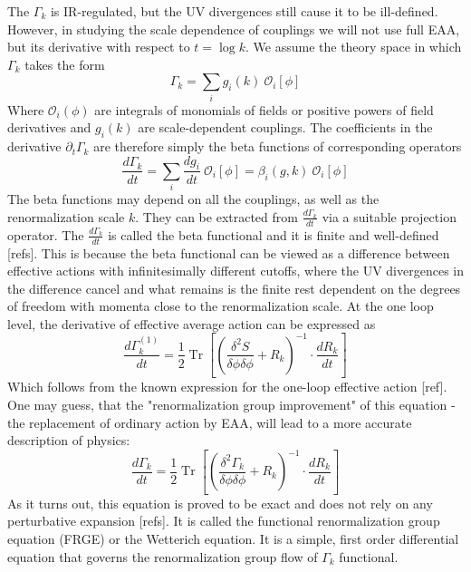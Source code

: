 \documentclass[11pt, a4paper]{article}
\begin{document}
The $\Gamma_k$ is IR-regulated, but the UV divergences still cause it to be ill-defined. 
However, in studying the scale dependence of couplings we will not use full EAA, 
but its derivative with respect to $t = \log{k}$.
We assume the theory space in which $\Gamma_k$ takes the form
\begin{equation}
    \Gamma_k = \sum_i g_i(k) \ \mathcal{O}_i [\phi]
    \label{gamma_decomp}
\end{equation}
Where $\mathcal{O}_i (\phi)$ are integrals of monomials of fields or positive powers of field derivatives 
and $g_i(k)$ are scale-dependent couplings.
The coefficients in the derivative $\partial_t \Gamma_k$ are therefore simply the beta functions of corresponding operators
\begin{equation}
    \frac{d \Gamma_k}{dt} = \sum_i \frac{d g_i}{dt} \ \mathcal{O}_i [\phi] = \beta_i(g,k) \ \mathcal{O}_i [\phi]
\end{equation}
The beta functions may depend on all the couplings, as well as the renormalization scale $k$.
They can be extracted from $\frac{d \Gamma_k}{dt}$ via a suitable projection operator. 
The $\frac{d \Gamma_k}{dt}$ is called the beta functional and it is finite and well-defined [refs].
This is because the beta functional can be viewed as a difference between effective actions with infinitesimally
different cutoffs, where the UV divergences in the difference cancel and what remains is the finite rest
dependent on the degrees of freedom with momenta close to the renormalization scale.
At the one loop level, the derivative of effective average action can be expressed as
\begin{equation}
    \frac{d \Gamma_k^{(1)}}{dt} = \frac{1}{2} \operatorname{Tr} \left[ \left(\frac{\delta^2 S}{\delta \phi \delta \phi} + R_k\right)^{-1} \cdot \frac{d R_k}{dt} \right]
\end{equation}
Which follows from the known expression for the one-loop effective action [ref].
One may guess, that the "renormalization group improvement" of this equation - the replacement of ordinary action by
 EAA, will lead to a more accurate description of physics:
\begin{equation}
    \frac{d \Gamma_k}{dt} = \frac{1}{2} \operatorname{Tr} \left[ \left(\frac{\delta^2 \Gamma_k}{\delta \phi \delta \phi} + R_k\right)^{-1} \cdot \frac{d R_k}{dt} \right]
    \label{FRGE}
\end{equation}
As it turns out, this equation is proved to be exact and does not rely on any perturbative expansion [refs].
It is called the functional renormalization group equation (FRGE) or the Wetterich equation.
It is a simple, first order differential equation that governs the renormalization group flow of $\Gamma_k$ functional.
\end{document}

